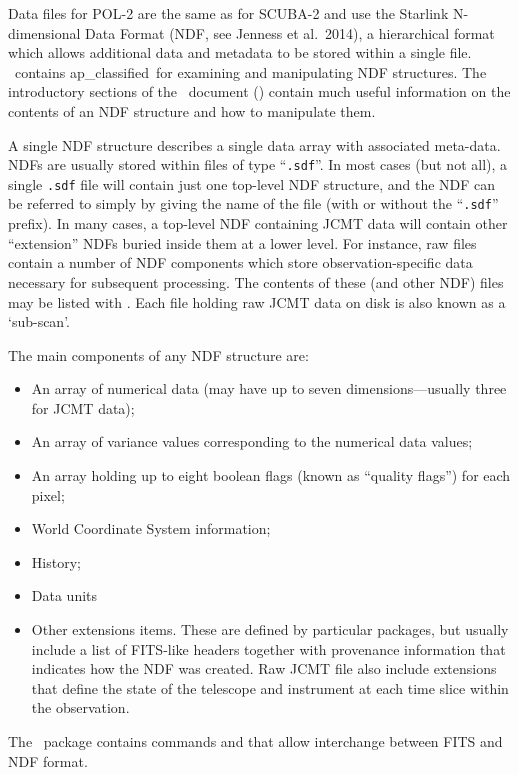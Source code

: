 Data files for POL-2 are the same as for SCUBA-2 and use 
the Starlink N-dimensional Data Format (NDF,
see Jenness et al.\ 2014\cite{ndf}), a hierarchical format which allows
additional data and metadata to be stored within a single file. \Kappa\
contains  {ap_classified}\ for examining and
manipulating NDF structures. The introductory sections of the \Kappa\
document () contain much useful information on
the contents of an NDF structure and how to manipulate them.

A single NDF structure describes a single data array with associated
meta-data. NDFs are usually stored within files of type ``\verb+.sdf+''.
In most cases (but not all), a single \verb+.sdf+ file will contain just
one top-level NDF structure, and the NDF can be referred to simply by
giving the name of the file (with or without the ``\verb+.sdf+'' prefix).
In many cases, a top-level NDF containing JCMT data will contain other
``extension'' NDFs buried inside them at a lower level. For instance, raw
files contain a number of NDF components which store observation-specific
data necessary for subsequent processing. The contents of these (and
other NDF) files may be listed with \HDSTRACEref. Each file holding raw
JCMT data on disk is also known as a `sub-scan'.

The main components of any NDF structure are:
\begin{itemize}
\item An array of numerical data (may have up to seven
dimensions---usually three for JCMT data);
\item An array of variance values corresponding to the numerical data
values;
\item An array holding up to eight boolean flags (known as ``quality
flags'') for each pixel;
\item World Coordinate System information;
\item History;
\item Data units
\item Other extensions items. These are defined by particular packages,
but usually include a list of FITS-like headers together with provenance
information that indicates how the NDF was created. Raw JCMT file also
include extensions that define the state of the telescope and instrument
at each time slice within the observation.
\end{itemize}

The \convert\ package contains commands  and
 that allow interchange between FITS
and NDF format.

